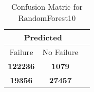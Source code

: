 \begin{table}[] 
\caption{Confusion Matric for RandomForest10} 
\label{Table: Prediction Accuracy-DMDRandomForest10OnlySunEKF-resetReflectionEKF-top2perfectNoFailurePrediction-Reflection} 
\centering 
\begin{tabular} 
 {@{}ccc@{}} 
\toprule 
\multicolumn{2}{c}{\textbf{Predicted}}
 \\ \midrule 
\multicolumn{1}{|c|}{Failure} & 
\multicolumn{1}{c|}{No Failure}
 \\ \midrule 
\multicolumn{1}{|c|}{\color{green}\textbf{122236}} & 
\multicolumn{1}{c|}{\color{red}\textbf{1079}}
 \\ \midrule 
\multicolumn{1}{|c|}{\color{red}\textbf{19356}} & 
\multicolumn{1}{c|}{\color{green}\textbf{27457}}
 \\ \bottomrule 
\end{tabular} 
\end{table} 

